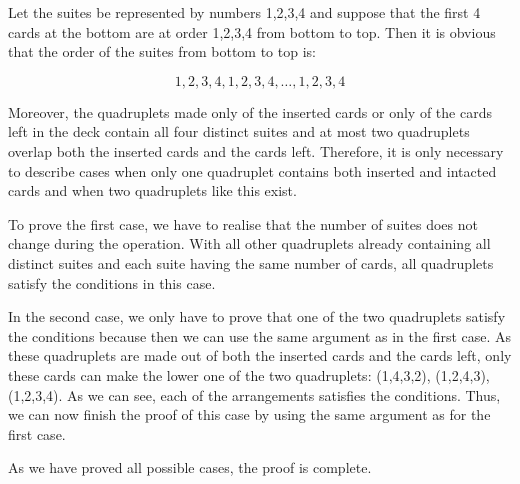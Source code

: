 \documentclass{fkssolpub}
\author{Ondřej Sedláček}
\begin{document}
Let the suites be represented by numbers 1,2,3,4 and suppose that the first 4 cards at the bottom are at order 1,2,3,4 from bottom to top. Then it is obvious that the order of the suites from bottom to top is:

\[
  1, 2, 3, 4, 1, 2, 3, 4, \dots, 1, 2, 3, 4
\]

Moreover, the quadruplets made only of the inserted cards or only of the cards left in the deck contain all four distinct suites and at most two quadruplets overlap both the inserted cards and the cards left. Therefore, it is only necessary to describe cases when only one quadruplet contains both inserted and intacted cards and when two quadruplets like this exist.

To prove the first case, we have to realise that the number of suites does not change during the operation. With all other quadruplets already containing all distinct suites and each suite having the same number of cards, all quadruplets satisfy the conditions in this case.

In the second case, we only have to prove that one of the two quadruplets satisfy the conditions because then we can use the same argument as in the first case. As these quadruplets are made out of both the inserted cards and the cards left, only these cards can make the lower one of the two quadruplets: (1,4,3,2), (1,2,4,3), (1,2,3,4). As we can see, each of the arrangements satisfies the conditions. Thus, we can now finish the proof of this case by using the same argument as for the first case.

As we have proved all possible cases, the proof is complete.
\end{document}
